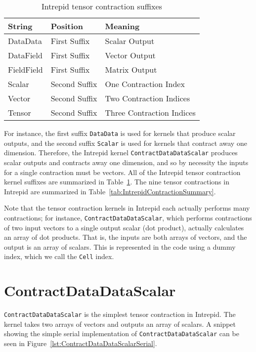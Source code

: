 \begin{table}[ht]
    \begin{center}
        \begin{tabular} {| l | l | l |}
            \hline
            \textbf{String} & \textbf{Position} & \textbf{Meaning} \\
            \hline
            DataData    & First Suffix  & Scalar Output    \\
            DataField   & First Suffix  & Vector Output    \\
            FieldField  & First Suffix  & Matrix Output    \\
            Scalar      & Second Suffix & One Contraction Index \\
            Vector      & Second Suffix & Two Contraction Indices \\
            Tensor      & Second Suffix & Three Contraction Indices \\
            \hline
        \end{tabular}
    \end{center}
\caption{Intrepid tensor contraction suffixes
\label{tab:IntrepidNamingConvention}}
\end{table}

For instance, the first suffix \texttt{DataData} is used for kernels that
produce scalar outputs, and the second suffix \texttt{Scalar} is used for
kernels that contract away one dimension.  Therefore, the Intrepid kernel
\texttt{ContractDataDataScalar} produces scalar outputs and contracts away one
dimension, and so by necessity the inputs for a single contraction must be
vectors.  All of the Intrepid tensor contraction kernel suffixes are summarized
in Table~\ref{tab:IntrepidNamingConvention}.  The nine tensor contractions in
Intrepid are summarized in Table~\ref{tab:IntrepidContractionSummary}.

Note that the tensor contraction kernels in Intrepid each actually performs many
contractions; for instance, \texttt{ContractDataDataScalar}, which performs
contractions of two input vectors to a single output scalar (dot product),
actually calculates an array of dot products.  That is, the inputs are both
arrays of vectors, and the output is an array of scalars.  This is represented
in the code using a dummy index, which we call the \texttt{Cell} index.

\section{ContractDataDataScalar}
\texttt{ContractDataDataScalar} is the simplest tensor contraction in Intrepid.
The kernel takes two arrays of vectors and outputs an array of scalars. A
snippet showing the simple serial implementation of
\texttt{ContractDataDataScalar} can be seen in
Figure~\ref{lst:ContractDataDataScalarSerial}.

